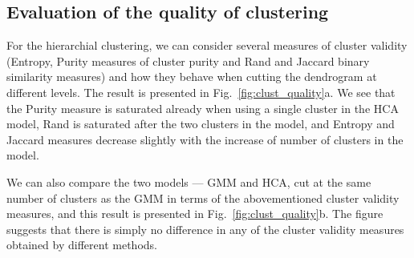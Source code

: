\documentclass[10pt, paper=a4]{article}
\begin{document}
\subsection{Evaluation of the quality of clustering}
For the hierarchial clustering, we can consider several measures of cluster
validity (Entropy, Purity measures of cluster purity and Rand and Jaccard binary
similarity measures) and how they behave when cutting the dendrogram at
different levels.  The result is presented in Fig.~\ref{fig:clust_quality}a.  We
see that the Purity measure is saturated already when using a single cluster in
the HCA model, Rand is saturated after the two clusters in the model, and
Entropy and Jaccard measures decrease slightly with the increase of number of
clusters in the model.

We can also compare the two models --- GMM and HCA, cut at the same number of
clusters as the GMM in terms of the abovementioned cluster validity measures,
and this result is presented in Fig.~\ref{fig:clust_quality}b.  The figure
suggests that there is simply no difference in any of the cluster validity
measures obtained by different methods.
\end{document}
